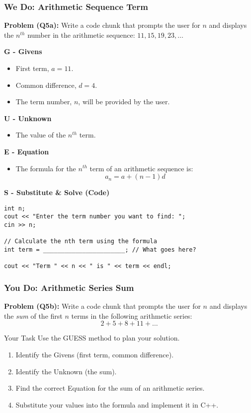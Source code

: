 \documentclass{beamer}
\begin{document}
\begin{frame}[fragile]
\frametitle{We Do: Arithmetic Sequence Term}
\textbf{Problem (Q5a):} Write a code chunk that prompts the user for $n$ and displays the $n^{th}$ number in the arithmetic sequence: $11, 15, 19, 23, \dots$
\vspace{1em}

\textbf{G - Givens}
\begin{itemize}
    \item First term, $a = 11$.
    \item Common difference, $d = 4$.
    \item The term number, $n$, will be provided by the user.
\end{itemize}
\pause
\textbf{U - Unknown}
\begin{itemize}
    \item The value of the $n^{th}$ term.
\end{itemize}
\pause
\textbf{E - Equation}
\begin{itemize}
    \item The formula for the $n^{th}$ term of an arithmetic sequence is:
    \[ a_n = a + (n-1)d \]
\end{itemize}
\pause
\textbf{S - Substitute \& Solve (Code)}
\begin{verbatim}
int n;
cout << "Enter the term number you want to find: ";
cin >> n;

// Calculate the nth term using the formula
int term = _______________________; // What goes here?

cout << "Term " << n << " is " << term << endl;
\end{verbatim}
\end{frame}

\begin{frame}
\frametitle{You Do: Arithmetic Series Sum}
\textbf{Problem (Q5b):} Write a code chunk that prompts the user for $n$ and displays the \textit{sum} of the first $n$ terms in the following arithmetic series:
\[ 2 + 5 + 8 + 11 + \dots \]
\vspace{1em}

\begin{alertblock}{Your Task}
Use the GUESS method to plan your solution.
\begin{enumerate}
    \item Identify the Givens (first term, common difference).
    \item Identify the Unknown (the sum).
    \item Find the correct Equation for the sum of an arithmetic series.
    \item Substitute your values into the formula and implement it in C++.
\end{enumerate}
\end{alertblock}
\end{frame}
\end{document}
